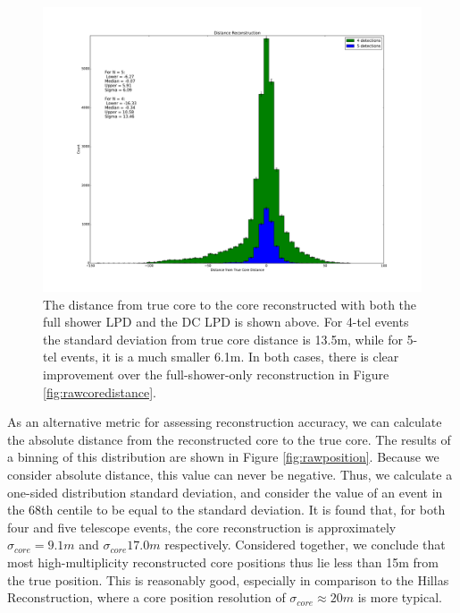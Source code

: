 \documentclass[11pt]{article}
\begin{document}
\begin{figure}
\begin{center}
\includegraphics[width=\textwidth]{coredistance}
\caption{The distance from true core to the core reconstructed with both the full shower LPD and the DC LPD is shown above. For 4-tel events the standard deviation from true core distance is 13.5m, while for 5-tel events, it is a much smaller 6.1m. In both cases, there is clear improvement over the full-shower-only reconstruction in Figure \ref{fig:rawcoredistance}.}
\label{fig:coredistance}
\end{center}
\end{figure}

As an alternative metric for assessing reconstruction accuracy, we can calculate the absolute distance from the reconstructed core to the true core. The results of a binning of this distribution are shown in Figure \ref{fig:rawposition}. Because we consider absolute distance, this value can never be negative. Thus, we calculate a one-sided distribution standard deviation, and consider the value of an event in the 68th centile to be equal to the standard deviation. It is found that, for both four and five telescope events, the core reconstruction is approximately $\sigma_{core} = 9.1m$ and $\sigma_{core} 17.0m$ respectively. Considered together, we conclude that most high-multiplicity reconstructed core positions thus lie less than 15m from the true position. This is reasonably good, especially in comparison to the Hillas Reconstruction, where a core position resolution of $\sigma_{core} \approx 20m$ is more typical.
\end{document}
